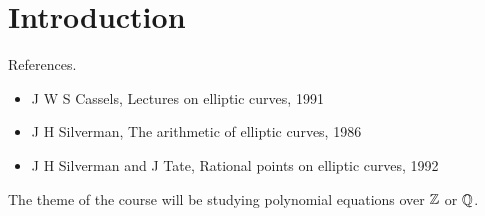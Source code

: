 \def\module{M4P32 Number Theory: Elliptic Curves}
\def\lecturer{Prof Toby Gee}
\def\term{Autumn 2018}
\def\cover{
$$
\begin{tikzpicture}[scale=2]
\draw [domain=-2:0] plot (\x, {sqrt(\x*(\x - 1)*(\x + 2))});
\draw [domain=-2:0] plot (\x, {-sqrt(\x*(\x - 1)*(\x + 2))});
\draw [domain=1:2] plot (\x, {sqrt(\x*(\x - 1)*(\x + 2))});
\draw [domain=1:2] plot (\x, {-sqrt(\x*(\x - 1)*(\x + 2))});
\draw [fill=black] (0, 0) circle (0.05) node[below left]{$ \OO $};
\draw [fill=black] (-0.25, 0.7) circle (0.05) node[above]{$ P $};
\draw [fill=black] (-2, 0) circle (0.05) node[below left]{$ Q $};
\draw [dashed, domain=-3:3] plot (\x, {0.4*(\x + 2)});
\draw [fill=black] (1.4, 1.35) circle (0.05) node[below right]{$ -\rb{P + Q} $};
\draw [dashed, domain=-3:3] plot (\x, \x);
\draw [fill=black] (-1.4, -1.4) circle (0.05) node[below right]{$ P + Q $};
\draw [fill=black] (-0.4, -0.95) circle (0.05) node[below]{$ R $};
\draw [dashed, domain=-3:3] plot (\x, {-0.6*(\x + 2)});
\draw [fill=black] (1.75, -2.25) circle (0.05) node[above right]{$ -\rb{Q + R} $};
\draw [dashed, domain=-2.5:2.5] plot (\x, {-1.3*\x});
\draw [fill=black] (-1.1, 1.45) circle (0.05) node[above right]{$ Q + R $};
\draw [dashed, domain=-3:3] plot (\x, {-0.8*\x + 0.55});
\draw [dashed, domain=-3:3] plot (\x, {0.45*\x - 0.75});
\draw [fill=black] (1.05, -0.3) circle (0.05) node[right]{$ S $};
\draw [dashed, domain=-3:3] plot (\x, {-0.3*\x});
\draw [fill=black] (-1.95, 0.55) circle (0.05) node[below left]{$ T $};
\draw (0, -2.5) node {$ T = -S = P + \rb{Q + R} = \rb{P + Q} + R $};
\end{tikzpicture}
$$
}
\def\syllabus{The $ p $-adic numbers. Basic algebraic geometry. Plane conics. The Hasse principle. Cubics. Elliptic curves over $ \Q_p $. Elliptic curves over $ \Q $. The Mordell-Weil theorem.}

\def\thm{section}







\section{Introduction}


References.
\begin{itemize}
\item J W S Cassels, Lectures on elliptic curves, 1991
\item J H Silverman, The arithmetic of elliptic curves, 1986
\item J H Silverman and J Tate, Rational points on elliptic curves, 1992
\end{itemize}
The theme of the course will be studying polynomial equations over $ \mathbb{Z} $ or $ \mathbb{Q} $.

